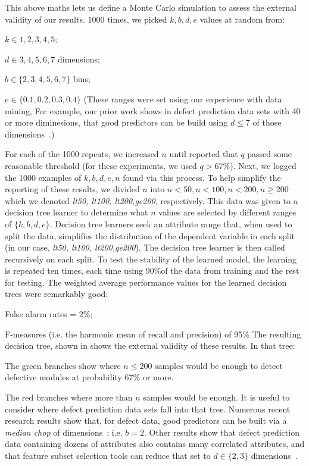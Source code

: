     This above maths lets us define
    a  Monte Carlo simulation to assess the external validity of our results.
    1000 times, we picked $k,b,d,e$ values at random from:
    \bi
      \item $k \in {1,2,3,4,5}$;
  \item $d \in {3,4,5,6,7}$ dimensions;
  \item $b \in \{2,3,4,5,6,7\}$ bins; 
    \item $e\in \{0.1,0.2,0.3,0.4\}$
      \ei
      (These ranges were set using our experience with data mining, For example, our prior work shows in defect prediction data sets
      with 40 or more diminesions, that good predictors can be build using $d\le 7$ of those dimensions~\cite{me07a}.)
      
    For each of the 1000 repeats,
     we increased $n$ until  reported that $q$ passed some reasonable threshold (for these experiments, we used $q>67\%$).
     Next, we logged the 1000 examples of   $k,b,d,e,n$ found via this process.
    To help simplify the reporting of these results,
     we divided $n$ into $n<50, n<100, n<200,n\ge200$ which we denoted {\em lt50, lt100, lt200,ge200}, respectively.
    This data was given to a decision tree learner to determine what $n$ values are selected by different
    ranges of $\{k,b,d,e\}$. Decision tree learners seek an attribute range that, when used to split the data,
      simplifies the distribution of the dependent variable in each split (in our case, {\em lt50, lt100, lt200,ge200}).
      The decision tree learner is then called recursively on each split.
      To test the stability of the learned model, the learning is repeated ten times, each time using 90\%of the data from training and the rest
      for testing. The weighted average performance values for the learned decision trees were remarkably good:
      \bi
    \item False alarm rates = 2\%;
    \item F-measures (i.e. the harmonic mean of recall and precision) of 95\%
      \ei
The resulting decision tree, shown in 
shows the external validity of these results. In that tree:
\bi
\item
The green branches show where $n \le 200$ samples would
be enough to detect defective modules at probability
67\% or more.
\item
The red branches where more than $n$ samples would be enough.
\ei
It is useful to consider where defect prediction data sets
fall into that tree.
Numerous
recent research results show that, for defect data,
good predictors can be built via a {\em median chop}
of dimensions~\cite{Zhang2014,nam2015clami};
i.e. $b=2$. Other results show that defect
prediction data containing dozens of attributes also
contains many correlated attributes, and that
feature subset
selection tools can reduce that set to
$d \in \{2,3\}$ dimensions~\cite{Menzies07}.


